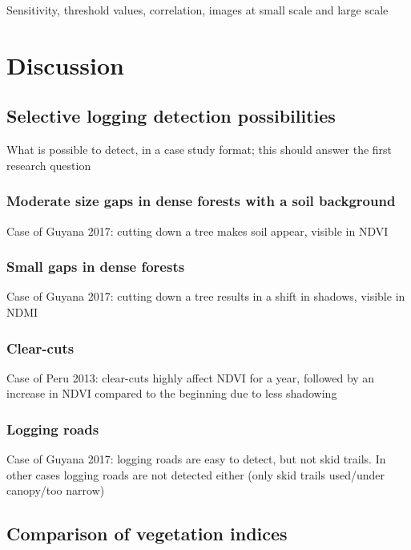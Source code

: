 \documentclass[a4paper,12pt]{scrbook}
\begin{document}
Sensitivity, threshold values, correlation, images at small scale and large scale

\chapter{Discussion}

\section{Selective logging detection possibilities}

What is possible to detect, in a case study format; this should answer the first research question

\subsection{Moderate size gaps in dense forests with a soil background}

Case of Guyana 2017: cutting down a tree makes soil appear, visible in \ac{NDVI}

\subsection{Small gaps in dense forests}

Case of Guyana 2017: cutting down a tree results in a shift in shadows, visible in \ac{NDMI}

\subsection{Clear-cuts}

Case of Peru 2013: clear-cuts highly affect \ac{NDVI} for a year, followed by an increase in \ac{NDVI} compared to the beginning due to less shadowing

\subsection{Logging roads}

Case of Guyana 2017: logging roads are easy to detect, but not skid trails. In other cases logging roads are not detected either (only skid trails used/under canopy/too narrow)

\section{Comparison of vegetation indices}
\end{document}
